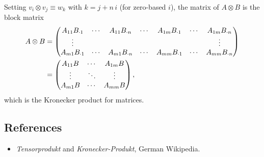 \documentclass[../../main.tex]{subfiles}
\begin{document}
Setting $v_i\otimes v_j\equiv w_k$ with $k=j+n\,i$ (for zero-based $i$), the matrix of
$A\otimes B$ is the block matrix
\begin{align}
A\otimes B
&=\begin{pmatrix}
A_{11}B_{\cdot 1}&\cdots&A_{11}B_{\cdot n}&\cdots&A_{1m}B_{\cdot 1}&\cdots&A_{1m}B_{\cdot n}\\
\vdots& & & & & &\vdots\\
A_{m1}B_{\cdot 1}&\cdots&A_{m1}B_{\cdot n}&\cdots&A_{mm}B_{\cdot 1}&\cdots&A_{mm}B_{\cdot n}
\end{pmatrix} \notag\\
&=\begin{pmatrix}
A_{11}B&\cdots&A_{1m}B\\
\vdots&\ddots&\vdots\\
A_{m1}B&\cdots&A_{mm}B
\end{pmatrix},
\end{align}
which is the Kronecker product for matrices.

\subsection{References}
\begin{itemize}
\item \emph{Tensorprodukt} and \emph{Kronecker-Produkt}, German Wikipedia.
\end{itemize}
\end{document}
